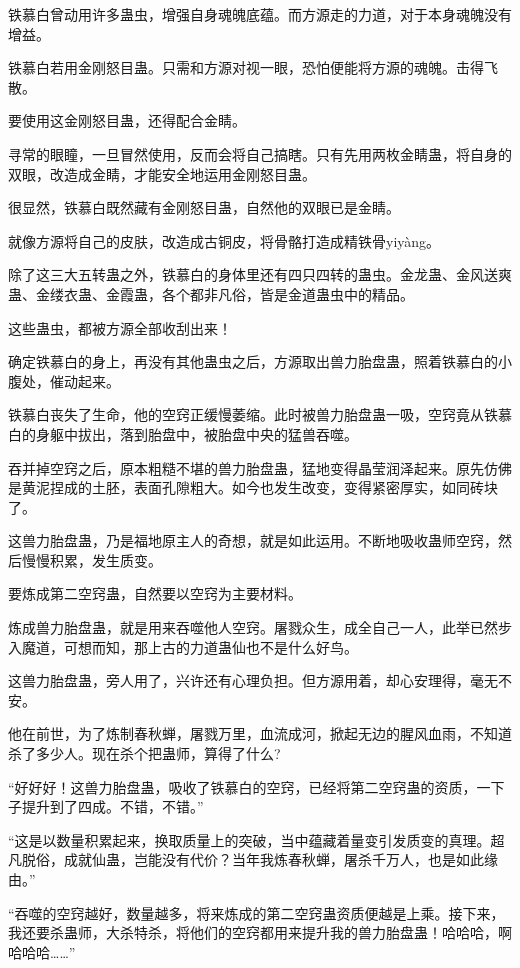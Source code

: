 \begin{this_body}
铁慕白曾动用许多蛊虫，增强自身魂魄底蕴。而方源走的力道，对于本身魂魄没有增益。

铁慕白若用金刚怒目蛊。只需和方源对视一眼，恐怕便能将方源的魂魄。击得飞散。

要使用这金刚怒目蛊，还得配合金睛。

寻常的眼瞳，一旦冒然使用，反而会将自己搞瞎。只有先用两枚金睛蛊，将自身的双眼，改造成金睛，才能安全地运用金刚怒目蛊。

很显然，铁慕白既然藏有金刚怒目蛊，自然他的双眼已是金睛。

就像方源将自己的皮肤，改造成古铜皮，将骨骼打造成精铁骨yiyàng。

除了这三大五转蛊之外，铁慕白的身体里还有四只四转的蛊虫。金龙蛊、金风送爽蛊、金缕衣蛊、金霞蛊，各个都非凡俗，皆是金道蛊虫中的精品。

这些蛊虫，都被方源全部收刮出来！

确定铁慕白的身上，再没有其他蛊虫之后，方源取出兽力胎盘蛊，照着铁慕白的小腹处，催动起来。

铁慕白丧失了生命，他的空窍正缓慢萎缩。此时被兽力胎盘蛊一吸，空窍竟从铁慕白的身躯中拔出，落到胎盘中，被胎盘中央的猛兽吞噬。

吞并掉空窍之后，原本粗糙不堪的兽力胎盘蛊，猛地变得晶莹润泽起来。原先仿佛是黄泥捏成的土胚，表面孔隙粗大。如今也发生改变，变得紧密厚实，如同砖块了。

这兽力胎盘蛊，乃是福地原主人的奇想，就是如此运用。不断地吸收蛊师空窍，然后慢慢积累，发生质变。

要炼成第二空窍蛊，自然要以空窍为主要材料。

炼成兽力胎盘蛊，就是用来吞噬他人空窍。屠戮众生，成全自己一人，此举已然步入魔道，可想而知，那上古的力道蛊仙也不是什么好鸟。

这兽力胎盘蛊，旁人用了，兴许还有心理负担。但方源用着，却心安理得，毫无不安。

他在前世，为了炼制春秋蝉，屠戮万里，血流成河，掀起无边的腥风血雨，不知道杀了多少人。现在杀个把蛊师，算得了什么?

“好好好！这兽力胎盘蛊，吸收了铁慕白的空窍，已经将第二空窍蛊的资质，一下子提升到了四成。不错，不错。”

“这是以数量积累起来，换取质量上的突破，当中蕴藏着量变引发质变的真理。超凡脱俗，成就仙蛊，岂能没有代价？当年我炼春秋蝉，屠杀千万人，也是如此缘由。”

“吞噬的空窍越好，数量越多，将来炼成的第二空窍蛊资质便越是上乘。接下来，我还要杀蛊师，大杀特杀，将他们的空窍都用来提升我的兽力胎盘蛊！哈哈哈，啊哈哈哈……”


\end{this_body}
